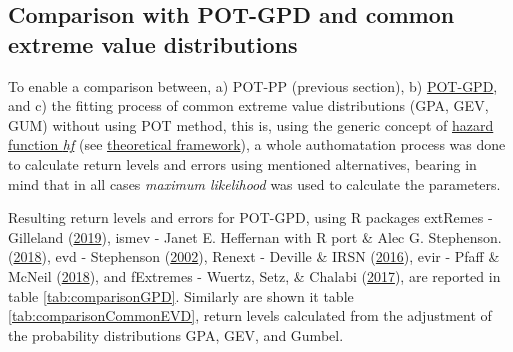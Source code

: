 \documentclass[12pt,oneside]{reedthesis}
\begin{document}
\hypertarget{comparison-with-pot-gpd-and-common-extreme-value-distributions}{%
\subsection{Comparison with POT-GPD and common extreme value distributions}\label{comparison-with-pot-gpd-and-common-extreme-value-distributions}}

To enable a comparison between, a) POT-PP (previous section), b) \protect\hyperlink{pot-gpd}{POT-GPD}, and c) the fitting process of common extreme value distributions (GPA, GEV, GUM) without using POT method, this is, using the generic concept of \protect\hyperlink{hf}{hazard function \emph{hf}} (see \protect\hyperlink{rmd-thefra}{theoretical framework}), a whole authomatation process was done to calculate return levels and errors using mentioned alternatives, bearing in mind that in all cases \emph{maximum likelihood} was used to calculate the parameters.

Resulting return levels and errors for POT-GPD, using R packages extRemes - Gilleland (\protect\hyperlink{ref-Gilleland2019}{2019}), ismev - Janet E. Heffernan with R port \& Alec G. Stephenson. (\protect\hyperlink{ref-JanetE.HeffernanwithRport2018}{2018}), evd - Stephenson (\protect\hyperlink{ref-Stephenson2002}{2002}), Renext - Deville \& IRSN (\protect\hyperlink{ref-Deville2016}{2016}), evir - Pfaff \& McNeil (\protect\hyperlink{ref-Pfaff2018}{2018}), and fExtremes - Wuertz, Setz, \& Chalabi (\protect\hyperlink{ref-Wuertz2017}{2017}), are reported in table \ref{tab:comparisonGPD}. Similarly are shown it table \ref{tab:comparisonCommonEVD}, return levels calculated from the adjustment of the probability distributions GPA, GEV, and Gumbel.
\end{document}
